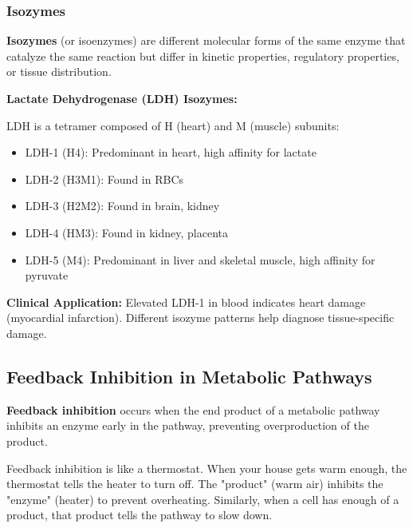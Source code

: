 \subsubsection{Isozymes}

\begin{definition}
\textbf{Isozymes} (or isoenzymes) are different molecular forms of the same enzyme that catalyze the same reaction but differ in kinetic properties, regulatory properties, or tissue distribution.
\end{definition}

\begin{example}
\textbf{Lactate Dehydrogenase (LDH) Isozymes:}

LDH is a tetramer composed of H (heart) and M (muscle) subunits:
\begin{itemize}
    \item LDH-1 (H4): Predominant in heart, high affinity for lactate
    \item LDH-2 (H3M1): Found in RBCs
    \item LDH-3 (H2M2): Found in brain, kidney
    \item LDH-4 (HM3): Found in kidney, placenta
    \item LDH-5 (M4): Predominant in liver and skeletal muscle, high affinity for pyruvate
\end{itemize}

\textbf{Clinical Application:} Elevated LDH-1 in blood indicates heart damage (myocardial infarction). Different isozyme patterns help diagnose tissue-specific damage.
\end{example}

\subsection{Feedback Inhibition in Metabolic Pathways}

\begin{definition}
\textbf{Feedback inhibition} occurs when the end product of a metabolic pathway inhibits an enzyme early in the pathway, preventing overproduction of the product.
\end{definition}

\begin{analogy}
Feedback inhibition is like a thermostat. When your house gets warm enough, the thermostat tells the heater to turn off. The "product" (warm air) inhibits the "enzyme" (heater) to prevent overheating. Similarly, when a cell has enough of a product, that product tells the pathway to slow down.
\end{analogy}

